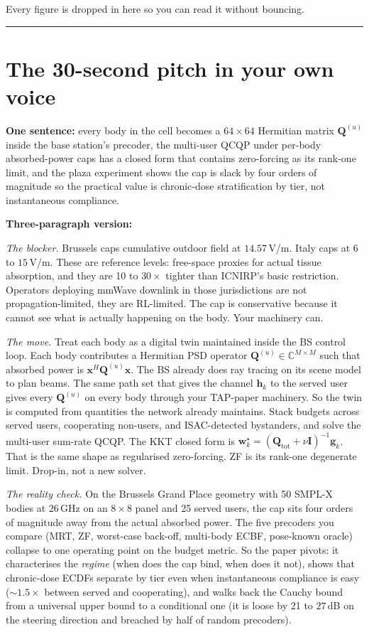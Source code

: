 \documentclass[11pt]{article}
\newcommand{\xx}{\mathbf{x}}
\newcommand{\hh}{\mathbf{h}}
\newcommand{\ww}{\mathbf{w}}
\newcommand{\gvec}{\mathbf{g}}
\newcommand{\Qmat}{\mathbf{Q}}
\begin{document}
Every figure is dropped in here so you can read it without bouncing.

\bigskip\hrule\bigskip

\section{The 30-second pitch in your own voice}

\textbf{One sentence:} every body in the cell becomes a $64\!\times\!64$
Hermitian matrix $\Qmat^{(u)}$ inside the base station's precoder, the
multi-user QCQP under per-body absorbed-power caps has a closed form
that contains zero-forcing as its rank-one limit, and the plaza
experiment shows the cap is slack by four orders of magnitude so the
practical value is chronic-dose stratification by tier, not
instantaneous compliance.

\textbf{Three-paragraph version:}

\textit{The blocker.} Brussels caps cumulative outdoor field at
$14.57\,$V/m. Italy caps at 6 to $15\,$V/m. These are reference levels:
free-space proxies for actual tissue absorption, and they are 10 to
$30\times$ tighter than ICNIRP's basic restriction. Operators
deploying mmWave downlink in those jurisdictions are not propagation-limited,
they are RL-limited. The cap is conservative because it cannot see what
is actually happening on the body. Your machinery can.

\textit{The move.} Treat each body as a digital twin maintained inside
the BS control loop. Each body contributes a Hermitian PSD operator
$\Qmat^{(u)} \in \mathbb{C}^{M \times M}$ such that absorbed power is
$\xx^H \Qmat^{(u)} \xx$. The BS already does ray tracing on its scene
model to plan beams. The same path set that gives the channel
$\hh_k$ to the served user gives every $\Qmat^{(u)}$ on every body
through your TAP-paper machinery. So the twin is computed from
quantities the network already maintains. Stack budgets across served
users, cooperating non-users, and ISAC-detected bystanders, and solve
the multi-user sum-rate QCQP. The KKT closed form is
$\ww_k^\star = (\Qmat_{\mathrm{tot}} + \nu \mathbf{I})^{-1} \gvec_k$.
That is the same shape as regularised zero-forcing. ZF is its
rank-one degenerate limit. Drop-in, not a new solver.

\textit{The reality check.} On the Brussels Grand Place geometry with
50 SMPL-X bodies at $26\,$GHz on an $8\!\times\!8$ panel and 25 served
users, the cap sits four orders of magnitude away from the actual
absorbed power. The five precoders you compare (MRT, ZF, worst-case
back-off, multi-body ECBF, pose-known oracle) collapse to one operating
point on the budget metric. So the paper pivots: it characterises the
\emph{regime} (when does the cap bind, when does it not), shows that
chronic-dose ECDFs separate by tier even when instantaneous compliance
is easy ($\sim 1.5\times$ between served and cooperating), and walks
back the Cauchy bound from a universal upper bound to a conditional
one (it is loose by 21 to $27\,$dB on the steering direction and
breached by half of random precoders).
\end{document}

